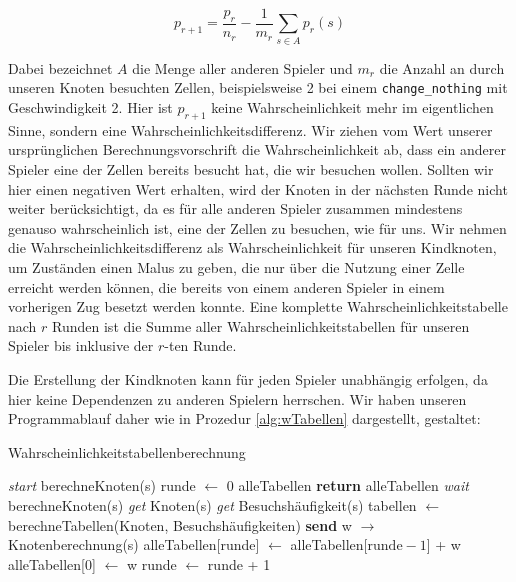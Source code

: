 \documentclass[12pt,a4paper]{article}
\begin{document}
$$ p_{r+1} = \frac{p_r}{n_r} -\frac{1}{m_r} \sum_{s\in A}p_r(s)$$

Dabei bezeichnet $A$ die Menge aller anderen Spieler und $m_r$ die Anzahl an durch unseren Knoten besuchten Zellen, beispielsweise 2 bei einem \texttt{change\_nothing} mit Geschwindigkeit 2. Hier ist $p_{r+1}$ keine Wahrscheinlichkeit mehr im eigentlichen Sinne, sondern eine Wahrscheinlichkeitsdifferenz. Wir ziehen vom Wert unserer ursprünglichen Berechnungsvorschrift die Wahrscheinlichkeit ab, dass ein anderer Spieler eine der Zellen bereits besucht hat, die wir besuchen wollen. Sollten wir hier einen negativen Wert erhalten, wird der Knoten in der nächsten Runde nicht weiter berücksichtigt, da es für alle anderen Spieler zusammen mindestens genauso wahrscheinlich ist, eine der Zellen zu besuchen, wie für uns. Wir nehmen die Wahrscheinlichkeitsdifferenz als Wahrscheinlichkeit für unseren Kindknoten, um Zuständen einen Malus zu geben, die nur über die Nutzung einer Zelle erreicht werden können, die bereits von einem anderen Spieler in einem vorherigen Zug besetzt werden konnte. Eine komplette Wahrscheinlichkeitstabelle nach $r$ Runden ist die Summe aller Wahrscheinlichkeitstabellen für unseren Spieler bis inklusive der $r$-ten Runde. 

Die Erstellung der Kindknoten kann für jeden Spieler unabhängig erfolgen, da hier keine Dependenzen zu anderen Spielern herrschen. Wir haben unseren Programmablauf daher wie in Prozedur \ref{alg:wTabellen} dargestellt, gestaltet:

\begin{algorithm} 
\caption{Wahrscheinlichkeitstabellenberechnung} 
\label{alg:wTabellen}
\begin{algorithmic}[1]
    \State \textit{start} berechneKnoten(s) \label{op1}
\EndFor
\State runde $\gets$ 0
\State alleTabellen
\While{}
     \label{op2}
            \State \textbf{return} alleTabellen \label{op7}
        \Else
            \State \textit{wait} berechneKnoten(s)
            \State \textit{get} Knoten(s)
            \State \textit{get} Besuchshäufigkeit(s)
        \EndIf
    \EndFor \label{op3}
    \State tabellen $\gets$ berechneTabellen(Knoten, Besuchshäufigkeiten)
        \State \textbf{send} w $\rightarrow$ Knotenberechnung(s) \label{op4}
         \label{op5}
                \State alleTabellen[runde] $\gets$ alleTabellen[$\mathrm{runde}-1$] + w
            \Else
                \State alleTabellen[0] $\gets$ w
            \EndIf
        \EndIf \label{op6}
    \EndFor
    \State runde $\gets$ runde + 1
\EndWhile

\EndFunction
\end{algorithmic}
\end{algorithm}
\end{document}
